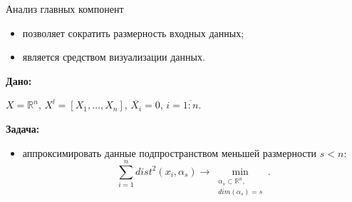 \documentclass[unicode, notheorems, pdf]{beamer}
\begin{document}
\begin{frame}{Анализ главных компонент}
	
	\begin{itemize}
		\item позволяет сократить размерность входных данных;
		\vspace{.25cm}
		\item является средством визуализации данных.
	\end{itemize}

	\pause
	\vspace{1cm}
	\textbf{Дано:}

	$X=\mathbb{R}^n$, $X^l=[X_1,\dots,X_n]$, $\overline{X_i}=0$, $i=\overline{1:n}$.

	\vspace{.5cm}
	\textbf{Задача:}
	\begin{itemize}
		\item аппроксимировать данные подпространством меньшей размерности $s<n$:
		\[\sum_{i=1}^{n}dist^2(x_i,\alpha_s) \longrightarrow \min_{\begin{array}{c}\scriptstyle\alpha_s \subset \mathbb{R}^n,\\\scriptstyle dim(\alpha_s)=s\end{array}}.\]		


		 
	\end{itemize}

\end{frame}
%
\end{document}
